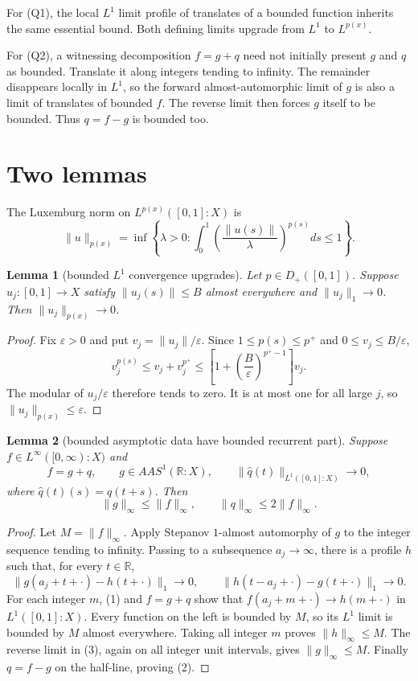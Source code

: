\documentclass[10pt]{article}
\newtheorem{lemma}{Lemma}
\newcommand{\R}{\mathbb R}
\begin{document}
For (Q1), the local $L^1$ limit profile of translates of a bounded function
inherits the same essential bound.  Both defining limits upgrade from $L^1$
to $L^{p(x)}$.

For (Q2), a witnessing decomposition $f=g+q$ need not initially present $g$
and $q$ as bounded.  Translate it along integers tending to infinity.  The
remainder disappears locally in $L^1$, so the forward almost-automorphic
limit of $g$ is also a limit of translates of bounded $f$.  The reverse limit
then forces $g$ itself to be bounded.  Thus $q=f-g$ is bounded too.

\section{Two lemmas}
The Luxemburg norm on $L^{p(x)}([0,1]:X)$ is
\[
 \|u\|_{p(x)}
 =\inf\left\{\lambda>0:
 \int_0^1\left(\frac{\|u(s)\|}{\lambda}\right)^{p(s)}ds\le1
 \right\}.
\]

\begin{lemma}[bounded $L^1$ convergence upgrades]\label{lem:upgrade}
Let $p\in D_+([0,1])$.  Suppose $u_j:[0,1]\to X$ satisfy
$\|u_j(s)\|\le B$ almost everywhere and $\|u_j\|_1\to0$.
Then $\|u_j\|_{p(x)}\to0$.
\end{lemma}

\begin{proof}
Fix $\varepsilon>0$ and put $v_j=\|u_j\|/\varepsilon$.  Since
$1\le p(s)\le p^+$ and $0\le v_j\le B/\varepsilon$,
\[
 v_j^{p(s)}
 \le v_j+v_j^{p^+}
 \le\left[1+\left(\frac B\varepsilon\right)^{p^+-1}\right]v_j.
\]
The modular of $u_j/\varepsilon$ therefore tends to zero.  It is at most one
for all large $j$, so $\|u_j\|_{p(x)}\le\varepsilon$.
\end{proof}

\begin{lemma}[bounded asymptotic data have bounded recurrent part]
\label{lem:parts}
Suppose $f\in L^\infty([0,\infty):X)$ and
\[
 f=g+q,\qquad
 g\in AAS^1(\R:X),\qquad
 \|\widehat q(t)\|_{L^1([0,1]:X)}\longrightarrow0,          \tag{1}
\]
where $\widehat q(t)(s)=q(t+s)$.  Then
\[
 \|g\|_\infty\le\|f\|_\infty,\qquad
 \|q\|_\infty\le2\|f\|_\infty.                              \tag{2}
\]
\end{lemma}

\begin{proof}
Let $M=\|f\|_\infty$.  Apply Stepanov $1$-almost automorphy of $g$ to the
integer sequence tending to infinity.  Passing to a subsequence
$a_j\to\infty$, there is a profile $h$ such that, for every $t\in\R$,
\[
 \|g(a_j+t+\cdot)-h(t+\cdot)\|_1\to0,\qquad
 \|h(t-a_j+\cdot)-g(t+\cdot)\|_1\to0.                       \tag{3}
\]
For each integer $m$, (1) and $f=g+q$ show that
$f(a_j+m+\cdot)\to h(m+\cdot)$ in $L^1([0,1]:X)$.  Every
function on the left is bounded by $M$, so its $L^1$ limit is bounded by $M$
almost everywhere.  Taking all integer $m$ proves $\|h\|_\infty\le M$.
The reverse limit in (3), again on all integer unit intervals, gives
$\|g\|_\infty\le M$.  Finally $q=f-g$ on the half-line, proving (2).
\end{proof}
\end{document}
